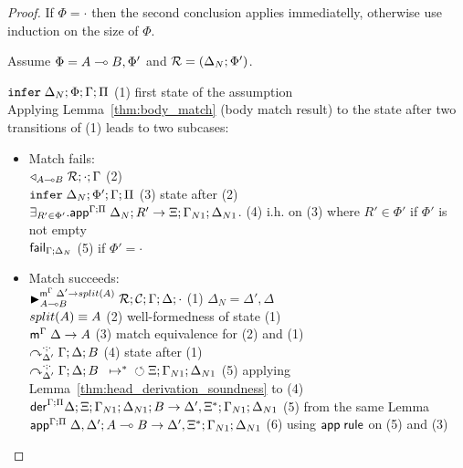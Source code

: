 \begin{proof}
If $\Phi = \cdot$ then the second conclusion applies immediatelly, otherwise use
induction on the size of $\Phi$.

Assume $\Phi = A \lolli B, \Phi'$ and $\rulestk = (\Delta_N; \Phi')$.

$\dostate{\Delta_N}{\Phi}{\Gamma}{\Pi}$ \hfill (1) first state of the assumption \\

Applying Lemma~\ref{thm:body_match} (body match result) to the state after two
transitions of (1) leads to two subcases:

\begin{itemize}[leftmargin=*]
   \item Match fails: \\
   $\contstate{A \lolli B}{\rulestk}{\cdot}{\Gamma}$ \hfill (2) \\
   $\dostate{\Delta_N}{\Phi'}{\Gamma}{\Pi}$ \hfill (3) state after (2) \\

   $\exists_{R' \in \Phi'}. \az{\Gamma}{\Delta_N}{\Pi}{R'}{\Xi; \Gamma_{N1};
   \Delta_{N1}}$. \hfill (4) i.h. on (3) where $R' \in \Phi'$ if $\Phi'$ is
   not empty \\

   $\failstate{\Gamma}{\Delta_N}$ \hfill (5) if $\Phi' = \cdot$ \\

   \item Match succeeds: \\

   $\matstate{A \lolli B}{\rulestk}{\lstack{C}}{\Gamma}{\Delta}{\cdot}{\Delta'
      \rightarrow split(A)}$ \hfill (1) $\Delta_N = \Delta', \Delta$ \\

   $\feq{split(A)}{A}$ \hfill (2) well-formedness of state (1) \\

   $\mz{\Gamma}{\Delta}{A}$ \hfill (3) match equivalence for (2) and (1) \\

   $\derstatex{\Gamma}{\Delta}{\Delta'}{\cdot}{\cdot}{B}$ \hfill (4) state
   after (1) \\

   $\transs{\derstatex{\Gamma}{\Delta}{\Delta'}{\cdot}{\cdot}{B}}{\finalstate{\Xi}{\Gamma_{N1}}{\Delta_{N1}}}$
   \hfill (5) applying Lemma~\ref{thm:head_derivation_soundness} to (4) \\

   $\dz{\Gamma}{\Pi}{\Delta}{\Xi}{\Gamma_{N1}}{\Delta_{N1}}{B}{\Delta', \Xi^{*}; \Gamma_{N1}; \Delta_{N1}}$ \hfill (5) from the
      same Lemma \\

   $\az{\Gamma}{\Delta, \Delta'}{\Pi}{A \lolli B}{\Delta', \Xi^{*}; \Gamma_{N1};
      \Delta_{N1}}$ \hfill (6) using $\azname \m{rule}$ on (5) and (3) \\

\end{itemize}

\end{proof}
